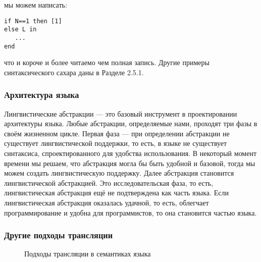 мы можем написать:

\begin{lstlisting}
if N==1 then [1]
else L in
   ...
end
\end{lstlisting}

что и короче и более читаемо чем полная запись. Другие примеры синтаксического сахара даны в Разделе 2.5.1.

\subsubsection{Архитектура языка}

Лингвистические абстракции --- это базовый инструмент в проектировании архитектуры языка. Любые абстракции, определяемые нами, проходят три фазы в своём жизненном цикле. Первая фаза --- при определении абстракции не существует лингвистической поддержки, то есть, в языке не существует синтаксиса, спроектированного для удобства использования. В некоторый момент времени мы решаем, что абстракция могла бы быть удобной и базовой, тогда мы можем создать лингвистическую поддержку. Далее абстракция становится лингвистической абстракцией. Это исследовательская фаза, то есть, лингвистическая абстракция ещё не подтверждена как часть языка. Если лингвистическая абстракция оказалась удачной, то есть, облегчает программирование и удобна для программистов, то она становится частью языка.

\subsubsection{Другие подходы трансляции}

\begin{figure}
\caption{Подходы трансляции в семантиках языка}
\label{figure:translation_approaches_to_language_semantics}
\end{figure}

